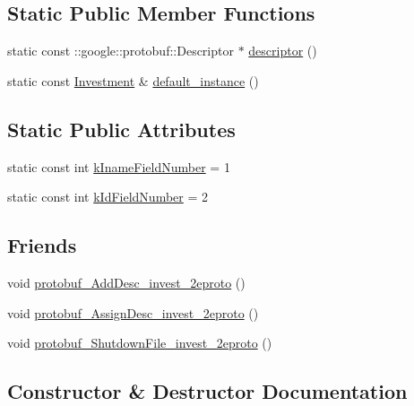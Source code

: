 \subsection*{Static Public Member Functions}
\begin{DoxyCompactItemize}
\item 
static const \+::google\+::protobuf\+::\+Descriptor $\ast$ \hyperlink{classinvest_1_1_investment_a2b181c2cbc60da79ca50cc40662b6a59}{descriptor} ()
\item 
static const \hyperlink{classinvest_1_1_investment}{Investment} \& \hyperlink{classinvest_1_1_investment_a0d625fcd71a59685af35446ca032733c}{default\+\_\+instance} ()
\end{DoxyCompactItemize}
\subsection*{Static Public Attributes}
\begin{DoxyCompactItemize}
\item 
static const int \hyperlink{classinvest_1_1_investment_a651f1cb02c3147523a22ee0682af0c64}{k\+Iname\+Field\+Number} = 1
\item 
static const int \hyperlink{classinvest_1_1_investment_a2aefbb43abeccada3705743e66c3f9b0}{k\+Id\+Field\+Number} = 2
\end{DoxyCompactItemize}
\subsection*{Friends}
\begin{DoxyCompactItemize}
\item 
void \hyperlink{classinvest_1_1_investment_a3ea8dbc072102205d2507d6dcf34b72a}{protobuf\+\_\+\+Add\+Desc\+\_\+invest\+\_\+2eproto} ()
\item 
void \hyperlink{classinvest_1_1_investment_adff030909acda53f62c6ee6efd55ee12}{protobuf\+\_\+\+Assign\+Desc\+\_\+invest\+\_\+2eproto} ()
\item 
void \hyperlink{classinvest_1_1_investment_a3819f54b1f4f0be84eae1b5f67660c0b}{protobuf\+\_\+\+Shutdown\+File\+\_\+invest\+\_\+2eproto} ()
\end{DoxyCompactItemize}


\subsection{Constructor \& Destructor Documentation}
\hypertarget{classinvest_1_1_investment_a4a49eb1f98a034ebd02c7f4fb87b6f15}{}

